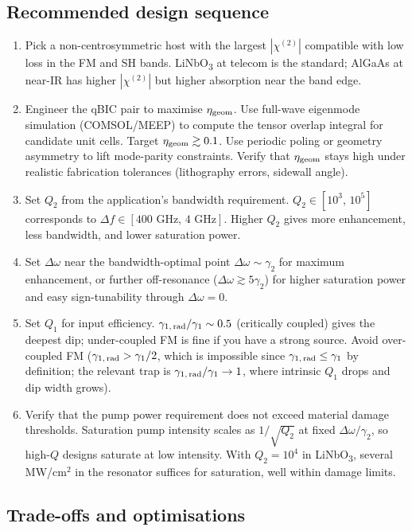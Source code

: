 \documentclass[11pt,a4paper]{article}
\newcommand{\chitwo}{\chi^{(2)}}
\newcommand{\Dom}{\Delta\omega}
\newcommand{\grad}{\gamma_{1,\,\rm rad}}
\newcommand{\geom}{{\rm geom}}
\begin{document}
\subsection{Recommended design sequence}

\begin{enumerate}
\item Pick a non-centrosymmetric host with the largest $|\chitwo|$
  compatible with low loss in the FM and SH bands.
  LiNbO\textsubscript{3} at telecom is the standard; AlGaAs at near-IR
  has higher $|\chitwo|$ but higher absorption near the band edge.
\item Engineer the qBIC pair to maximise $\eta_\geom$. Use full-wave
  eigenmode simulation (COMSOL/MEEP) to compute the tensor overlap
  integral for candidate unit cells. Target $\eta_\geom \gtrsim 0.1$.
  Use periodic poling or geometry asymmetry to lift mode-parity
  constraints. Verify that $\eta_\geom$ stays high under realistic
  fabrication tolerances (lithography errors, sidewall angle).
\item Set $Q_2$ from the application's bandwidth requirement.
  $Q_2 \in [10^{3},\, 10^{5}]$ corresponds to
  $\Delta f \in [400\text{ GHz},\, 4\text{ GHz}]$. Higher $Q_2$ gives
  more enhancement, less bandwidth, and lower saturation power.
\item Set $\Dom$ near the bandwidth-optimal point
  $\Dom \sim \gamma_2$ for maximum enhancement, or further off-resonance
  ($\Dom \gtrsim 5\gamma_2$) for higher saturation power and easy
  sign-tunability through $\Dom = 0$.
\item Set $Q_1$ for input efficiency. $\grad/\gamma_1 \sim 0.5$
  (critically coupled) gives the deepest dip; under-coupled FM is
  fine if you have a strong source. Avoid over-coupled FM
  ($\grad > \gamma_1/2$, which is impossible since
  $\grad \le \gamma_1$ by definition; the relevant trap is
  $\grad/\gamma_1 \to 1$, where intrinsic $Q_1$ drops and dip width
  grows).
\item Verify that the pump power requirement does not exceed material
  damage thresholds. Saturation pump intensity scales as $1/\sqrt{Q_2}$
  at fixed $\Dom/\gamma_2$, so high-$Q$ designs saturate at low
  intensity. With $Q_2 = 10^{4}$ in LiNbO\textsubscript{3}, several
  MW/cm$^{2}$ in the resonator suffices for saturation, well within
  damage limits.
\end{enumerate}

\subsection{Trade-offs and optimisations}
\end{document}
